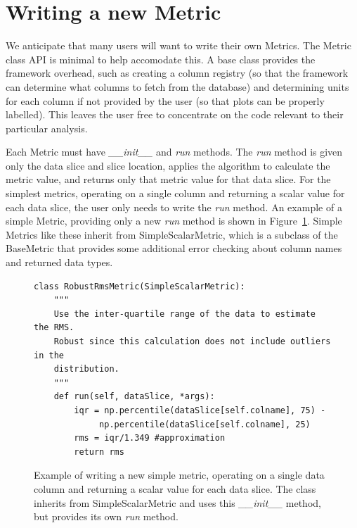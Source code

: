 \documentclass[]{spie}  %
\begin{document}


\section{Writing a new Metric}
\label{sec:MetricAPI}

We anticipate that many users will want to write their own Metrics.
The Metric class API is minimal to help accomodate
this. A base class provides the framework overhead, such as creating a
column registry (so that the framework can determine what columns to
fetch from the database) and determining units for each column if not
provided by the user (so that plots can be properly labelled). This
leaves the user free to concentrate on the code relevant to their
particular analysis.

Each Metric must have {\it \_\_init\_\_} and {\it run} methods. The
{\it run} method is given only the data slice and slice location, applies the algorithm
to calculate the metric value, and returns only that metric value for
that data slice. For the simplest metrics,
operating on a single column and returning a scalar value for each
data slice, the user only needs to write the {\it run} method.  An
example of a simple Metric, providing only a new {\it run} method is
shown in Figure~\ref{fig:simplemetric}. Simple Metrics like these
inherit from SimpleScalarMetric, which is a subclass of the BaseMetric
that provides some additional error checking about column names and
returned data types.

\begin{figure}
\centering
\begin{lstlisting}[frame=single]
class RobustRmsMetric(SimpleScalarMetric):
    """
    Use the inter-quartile range of the data to estimate the RMS.  
    Robust since this calculation does not include outliers in the
    distribution.
    """
    def run(self, dataSlice, *args):
        iqr = np.percentile(dataSlice[self.colname], 75) - 
             np.percentile(dataSlice[self.colname], 25)
        rms = iqr/1.349 #approximation
        return rms
\end{lstlisting}
\caption[]
{ \label{fig:simplemetric} Example of writing a new simple metric,
  operating on a single data column and returning a scalar value for
  each data slice. The class inherits from SimpleScalarMetric and uses
  this {\it \_\_init\_\_} method, but provides its own {\it run}
  method. }
\end{figure}
\end{document}
